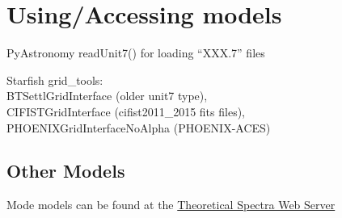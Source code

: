 \documentclass[12pt, a4paper]{article}
\begin{document}
\section{Using/Accessing models}

PyAstronomy readUnit7()  for loading ``XXX.7'' files

Starfish  grid\_tools: \\BTSettlGridInterface (older unit7 type),\\ CIFISTGridInterface (cifist2011\_2015 fits files), \\ PHOENIXGridInterfaceNoAlpha (PHOENIX-ACES)


\subsection{Other Models}
Mode models can be found at the 
\href{http://svo2.cab.inta-csic.es/theory/newov/index.php}{Theoretical Spectra Web Server}
\end{document}
